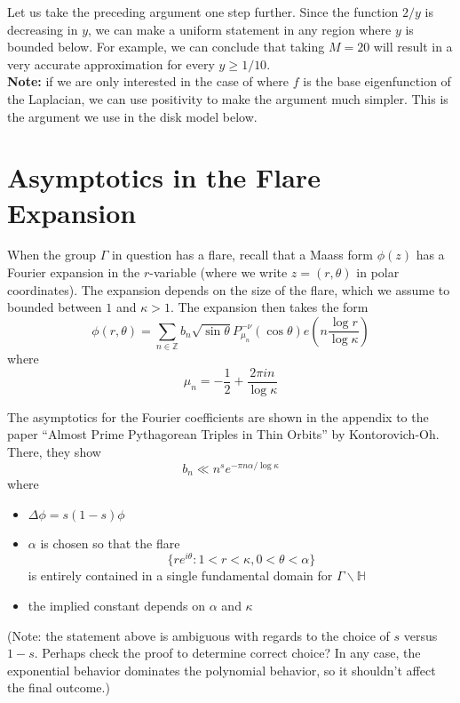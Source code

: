 \documentclass[]{article}
\begin{document}
Let us take the preceding argument one step further.
Since the function $2/y$ is decreasing in $y$, we can make a uniform statement in any region where $y$ is bounded below.
For example, we can conclude that taking $M = 20$ will result in a very accurate approximation for every $y \geq 1/10$.
\\

\textbf{Note:} if we are only interested in the case of where $f$ is the base eigenfunction of the Laplacian, we can use positivity to make the argument much simpler.
This is the argument we use in the disk model below.

\section*{Asymptotics in the Flare Expansion}

When the group $\Gamma$ in question has a flare, recall that a Maass form $\phi(z)$ has a Fourier expansion in the $r$-variable (where we write $z = (r, \theta)$ in polar coordinates).
The expansion depends on the size of the flare, which we assume to bounded between $1$ and $\kappa > 1$.
The expansion then takes the form
\begin{equation}\label{flareExp}
\phi(r, \theta) = \sum_{n\in\mathbb{Z}}b_n\sqrt{\sin\theta}P_{\mu_n}^{-\nu}(\cos\theta)e\left( n\frac{\log r}{\log\kappa} \right)
\end{equation}
where
$$
\mu_n = -\frac{1}{2} + \frac{2\pi in}{\log\kappa}
$$

The asymptotics for the Fourier coefficients are shown in the appendix to the paper ``Almost Prime Pythagorean Triples in Thin Orbits'' by Kontorovich-Oh.
There, they show
$$
b_n \ll n^se^{-\pi n\alpha/\log\kappa}
$$
where
\begin{itemize}
	\item $\Delta\phi = s(1-s)\phi$
	\item $\alpha$ is chosen so that the flare
	$$
	\{ re^{i\theta} : 1 < r < \kappa, 0 < \theta < \alpha \}
	$$
	is entirely contained in a single fundamental domain for $\Gamma\backslash\mathbb{H}$
	\item the implied constant depends on $\alpha$ and $\kappa$
\end{itemize}
(Note: the statement above is ambiguous with regards to the choice of $s$ versus $1 - s$.
Perhaps check the proof to determine correct choice? In any case, the exponential behavior dominates the polynomial behavior, so it shouldn't affect the final outcome.)
\end{document}
